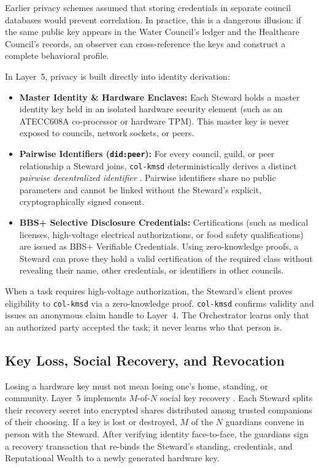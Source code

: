 Earlier privacy schemes assumed that storing credentials in separate council databases would prevent correlation. In practice, this is a dangerous illusion: if the same public key appears in the Water Council's ledger and the Healthcare Council's records, an observer can cross-reference the keys and construct a complete behavioral profile.

In Layer~5, privacy is built directly into identity derivation:
\begin{itemize}
  \item \textbf{Master Identity \& Hardware Enclaves:} Each Steward holds a master identity key held in an isolated hardware security element (such as an ATECC608A co-processor or hardware TPM). This master key is never exposed to councils, network sockets, or peers.
  \item \textbf{Pairwise Identifiers (\texttt{did:peer}):} For every council, guild, or peer relationship a Steward joins, \texttt{col-kmsd} deterministically derives a distinct \textit{pairwise decentralized identifier} \parencite{w3c2022vc}. Pairwise identifiers share no public parameters and cannot be linked without the Steward's explicit, cryptographically signed consent.
  \item \textbf{BBS+ Selective Disclosure Credentials:} Certifications (such as medical licenses, high-voltage electrical authorizations, or food safety qualifications) are issued as BBS+ Verifiable Credentials. Using zero-knowledge proofs, a Steward can prove they hold a valid certification of the required class without revealing their name, other credentials, or identifiers in other councils.
\end{itemize}

When a task requires high-voltage authorization, the Steward's client proves eligibility to \texttt{col-kmsd} via a zero-knowledge proof. \texttt{col-kmsd} confirms validity and issues an anonymous claim handle to Layer~4. The Orchestrator learns only that an authorized party accepted the task; it never learns who that person is.

\subsection{Key Loss, Social Recovery, and Revocation}

Losing a hardware key must not mean losing one's home, standing, or community. Layer~5 implements $M$-of-$N$ social key recovery \parencite{shamir1979}. Each Steward splits their recovery secret into encrypted shares distributed among trusted companions of their choosing. If a key is lost or destroyed, $M$ of the $N$ guardians convene in person with the Steward. After verifying identity face-to-face, the guardians sign a recovery transaction that re-binds the Steward's standing, credentials, and Reputational Wealth to a newly generated hardware key.

